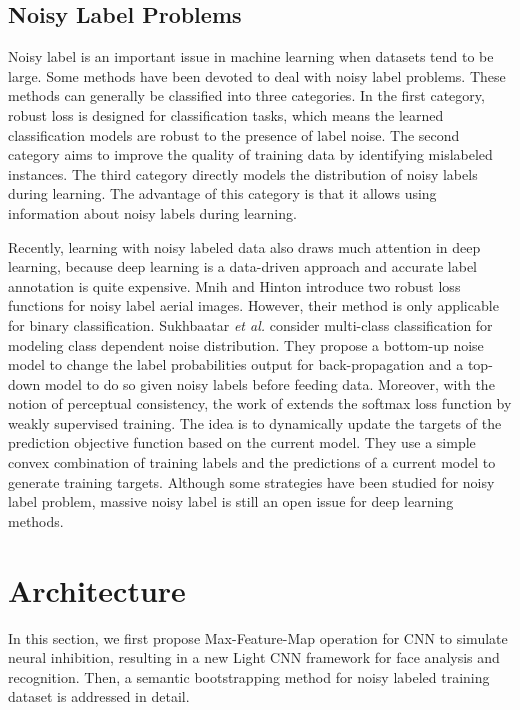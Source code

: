 \documentclass[journal,transmag]{IEEEtran}
\begin{document}
\subsection{Noisy Label Problems}

Noisy label is an important issue in machine learning when datasets tend to be large. Some methods \cite{DBLP:journals/tnn/FrenayV14} have been devoted to deal with noisy label problems. These methods can generally be classified into three categories. In the first category, robust loss \cite{DBLP:conf/acl/BeigmanK09} is designed for classification tasks, which means the learned classification models are robust to the presence of label noise.  The second category \cite{DBLP:conf/icml/WilsonM97} aims to improve the quality of training data by identifying mislabeled instances. The third category \cite{DBLP:conf/icml/LawrenceS01} directly models the distribution of noisy labels during learning. The advantage of this category is that it allows using information about noisy labels during learning.

Recently, learning with noisy labeled data also draws much attention in deep learning, because deep learning is a data-driven approach and accurate label annotation is quite expensive. Mnih and Hinton \cite{DBLP:conf/icml/MnihH12} introduce two robust loss functions for noisy label aerial images. However, their method is only applicable for binary classification.
Sukhbaatar \emph{et al.} \cite{DBLP:journals/corr/SukhbaatarF14} consider multi-class classification for modeling class dependent noise distribution. They propose a bottom-up noise model to change the label probabilities output for back-propagation and a top-down model to do so given noisy labels before feeding data.
Moreover, with the notion of perceptual consistency, the work of \cite{DBLP:journals/corr/ReedLASER14} extends the softmax loss function by weakly supervised training. The idea is to dynamically update the targets of the prediction objective function based on the current model. They use a simple convex combination of training labels and the predictions of a current model to generate training targets. Although some strategies have been studied for noisy label problem, massive noisy label is still an open issue for deep learning methods.

\section{Architecture}

In this section, we first propose Max-Feature-Map operation for CNN to simulate neural inhibition, resulting in a new Light CNN framework for face analysis and recognition. Then, a semantic bootstrapping method for noisy labeled training dataset is addressed in detail.
\end{document}

